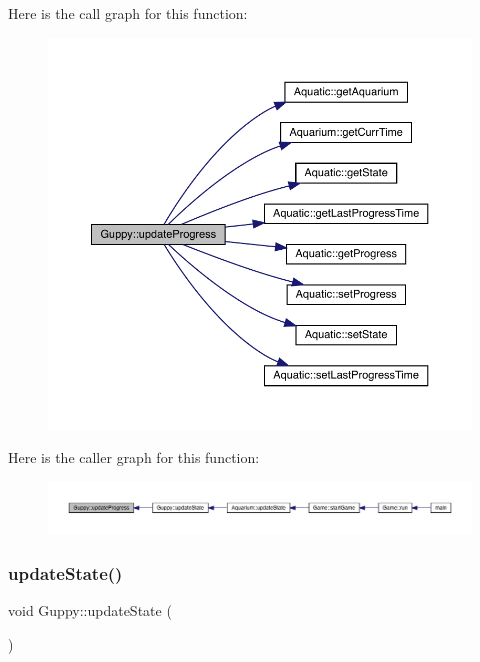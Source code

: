 Here is the call graph for this function\+:\nopagebreak
\begin{figure}[H]
\begin{center}
\leavevmode
\includegraphics[width=350pt]{class_guppy_af22eacc4a1ea7bec4be7b5d82148407b_cgraph}
\end{center}
\end{figure}
Here is the caller graph for this function\+:\nopagebreak
\begin{figure}[H]
\begin{center}
\leavevmode
\includegraphics[width=350pt]{class_guppy_af22eacc4a1ea7bec4be7b5d82148407b_icgraph}
\end{center}
\end{figure}
\mbox{\label{class_guppy_ac62ef7053d40430ad98c1d5a54699f9d}} 
\subsubsection{\texorpdfstring{update\+State()}{updateState()}}
{\footnotesize\ttfamily void Guppy\+::update\+State (\begin{DoxyParamCaption}{ }\end{DoxyParamCaption})\hspace{0.3cm}{\ttfamily [virtual]}}



